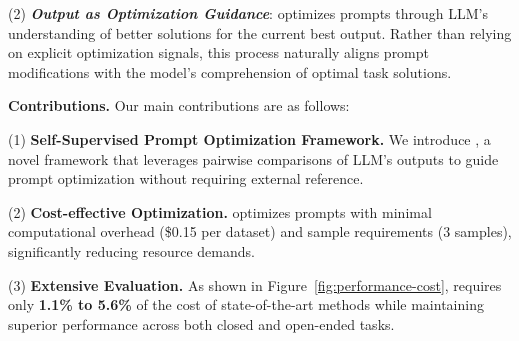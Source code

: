 (2) \textbf{\textit{Output as Optimization Guidance}}: \ours optimizes prompts through LLM's understanding of better solutions for the current best output. Rather than relying on explicit optimization signals, this process naturally aligns prompt modifications with the model's comprehension of optimal task solutions.

\textbf{Contributions.}
Our main contributions are as follows:

(1) \textbf{Self-Supervised Prompt Optimization Framework.} We introduce \ours, a novel framework that leverages pairwise comparisons of LLM's outputs to guide prompt optimization without requiring external reference.

(2) \textbf{Cost-effective Optimization.} 
\ours optimizes prompts with minimal computational overhead (\$0.15 per dataset) and sample requirements (3 samples), significantly reducing resource demands.

(3) \textbf{Extensive Evaluation.} As shown in Figure~\ref{fig:performance-cost}, \ours requires only \textbf{1.1\% to 5.6\%} of the cost of state-of-the-art methods while maintaining superior performance across both closed and open-ended tasks.



